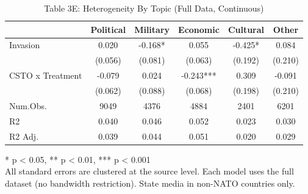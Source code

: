 \begin{table}[!t]
\caption{Table 3E: Heterogeneity By Topic (Full Data, Continuous)} 
\fontsize{12.0pt}{14.4pt}\selectfont
\begin{tabular*}{\linewidth}{@{\extracolsep{\fill}}lccccc}
\toprule
  & Political & Military & Economic & Cultural & Other \\ 
\midrule\addlinespace[2.5pt]
Invasion & 0.020 & -0.168* & 0.055 & -0.425* & 0.084 \\ 
 & (0.056) & (0.081) & (0.063) & (0.192) & (0.210) \\ 
CSTO x Treatment & -0.079 & 0.024 & -0.243*** & 0.309 & -0.091 \\ 
{} & {(0.062)} & {(0.088)} & {(0.068)} & {(0.198)} & {(0.210)} \\ 
Num.Obs. & 9049 & 4376 & 4884 & 2401 & 6201 \\ 
R2 & 0.040 & 0.046 & 0.052 & 0.023 & 0.030 \\ 
R2 Adj. & 0.039 & 0.044 & 0.051 & 0.020 & 0.029 \\ 
\bottomrule
\end{tabular*}
\begin{minipage}{\linewidth}
* p < 0.05, ** p < 0.01, *** p < 0.001\\
All standard errors are clustered at the source level. Each model uses the full
dataset (no bandwidth restriction). State media in non-NATO countries only.\\
\end{minipage}
\end{table}

